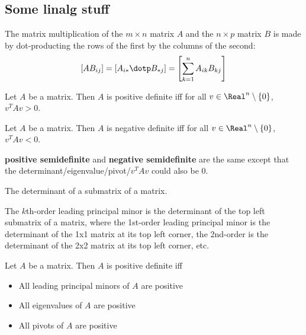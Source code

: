 \subsection{Some linalg stuff}

\begin{definition}
  The matrix multiplication of  the $m \times n$ matrix $A$ and the $n \times p$ matrix $B$ is made by dot-producting the rows of the first by the columns of the second:
  \[
    \left[AB_{ij}\right] = \left[A_{i*} \dotp B_{*j}\right] = \left[\sum_{k=1}^n A_{ik} B_{kj} \right]
  \]
\end{definition}

\begin{definition}
  Let $A$ be a matrix. Then $A$ is positive definite iff for all $v \in \Real^n \setminus \{0\}$, $v^T A v > 0$.
\end{definition}

\begin{definition}
  Let $A$ be a matrix. Then $A$ is negative definite iff for all $v \in \Real^n \setminus \{0\}$, $v^T A v < 0$.
\end{definition}

\textbf{positive semidefinite} and \textbf{negative semidefinite} are the same except that the determinant/eigenvalue/pivot/$v^T A v$ could also be 0.

\begin{definition}
  The determinant of a submatrix of a matrix.
\end{definition}

\begin{definition}
  The $k$th-order leading principal minor is the determinant of the top left submatrix of a matrix, where the 1st-order leading principal minor is the determinant of the 1x1 matrix at its top left corner, the 2nd-order is the determinant of the 2x2 matrix at its top left corner, etc.
\end{definition}

\begin{theorem}
  Let $A$ be a matrix. Then $A$ is positive definite iff
  \begin{itemize}
    \item All leading principal minors of $A$ are positive
    \item All eigenvalues of $A$ are positive
    \item All pivots of $A$ are positive
  \end{itemize}
\end{theorem}

